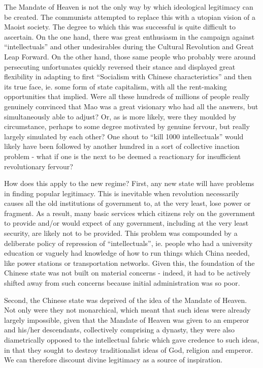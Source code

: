 \documentclass[10pt,a4paper,twocolumn]{article}
\newcounter{count}
\begin{document}
The Mandate of Heaven is not the only way by which ideological legitimacy can be created. The communists attempted to replace this with a utopian vision of a Maoist society. The degree to which this was successful is quite difficult to ascertain. On the one hand, there was great enthusiasm in the campaign against ``intellectuals'' and other undesirables during the Cultural Revolution and Great Leap Forward. On the other hand, those same people who probably were around persecuting unfortunates quickly reversed their stance and displayed great flexibility in adapting to first ``Socialism with Chinese characteristics'' and then its true face, ie. some form of state capitalism, with all the rent-making opportunities that implied. Were all these hundreds of millions of people really genuinely convinced that Mao was a great visionary who had all the answers, but simultaneously able to adjust? Or, as is more likely, were they moulded by circumstance, perhaps to some degree motivated by genuine fervour, but really largely simulated by each other? One shout to ``kill 1000 intellectuals'' would likely have been followed by another hundred in a sort of collective inaction problem - what if one is the next to be deemed a reactionary for insufficient revolutionary fervour?

How does this apply to the new regime? First, any new state will have problems in finding popular legitimacy. This is inevitable when revolution necessarily causes all the old institutions of government to, at the very least, lose power or fragment. As a result, many basic services which citizens rely on the government to provide and/or would expect of any government, including at the very least security, are likely not to be provided. This problem was compounded by a deliberate policy of repression of ``intellectuals'', ie. people who had a university education or vaguely had knowledge of how to run things which China needed, like power stations or transportation networks. Given this, the foundation of the Chinese state was not built on material concerns - indeed, it had to be actively shifted away from such concerns because initial administration was so poor.

Second, the Chinese state was deprived of the idea of the Mandate of Heaven. Not only were they not monarchical, which meant that such ideas were already largely impossible, given that the Mandate of Heaven was given to an emperor and his/her descendants, collectively comprising a dynasty, they were also diametrically opposed to the intellectual fabric which gave credence to such ideas, in that they sought to destroy traditionalist ideas of God, religion and emperor. We can therefore discount divine legitimacy as a source of inspiration.
\end{document}

